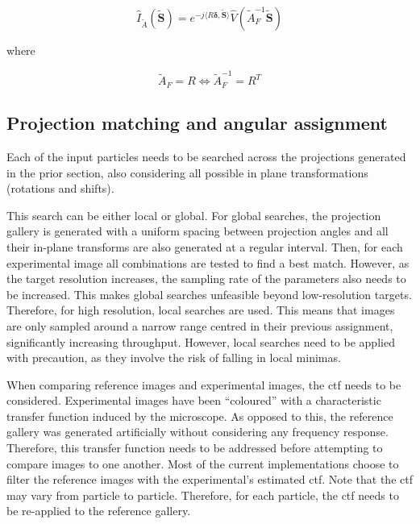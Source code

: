 \documentclass[../main.tex]{subfiles}
\begin{document}
\begin{equation}\label{eq:3:projection_fourier}
    \hat{I}_{\tilde{A}}(\bm{\tilde{S}}) = e^{-j\langle R\bm{\delta, \bm{\tilde{S}}}\rangle}\hat{V}(\tilde{A}_F^{-1}\bm{\tilde{S}})
\end{equation}

where 

\begin{equation}\label{eq:3:projection_fourier_pose}
    \tilde{A}_F = R \Leftrightarrow \tilde{A}_F^{-1} = R^T
\end{equation}

\subsection{Projection matching and angular assignment}
Each of the input particles needs to be searched across the projections generated in the prior section, also considering all possible in plane transformations (rotations and shifts). 

This search can be either local or global. For global searches, the projection gallery is generated with a uniform spacing between projection angles and all their in-plane transforms are also generated at a regular interval. Then, for each experimental image all combinations are tested to find a best match. However, as the target resolution increases, the sampling rate of the parameters also needs to be increased. This makes global searches unfeasible beyond low-resolution targets. Therefore, for high resolution, local searches are used. This means that images are only sampled around a narrow range centred in their previous assignment, significantly increasing throughput\cite{cryosparc}\cite{scheres2021}. However, local searches need to be applied with precaution, as they involve the risk of falling in local minimas.

When comparing reference images and experimental images, the \gls{ctf} needs to be considered. Experimental images have been ``coloured'' with a characteristic transfer function induced by the microscope. As opposed to this, the reference gallery was generated artificially without considering any frequency response. Therefore, this transfer function needs to be addressed before attempting to compare images to one another. Most of the current implementations choose to filter the reference images with the experimental's estimated \gls{ctf}. Note that the \gls{ctf} may vary from particle to particle\cite{sorzano2017b}. Therefore, for each particle, the \gls{ctf} needs to be re-applied to the reference gallery.
\end{document}
